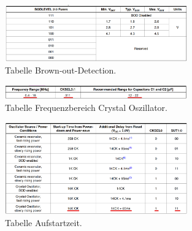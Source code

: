

\begin{figure}[H]
	\centering
	\includegraphics[width=0.7\textwidth]{graphics/Tabelle_BoD}
	\caption{Tabelle Brown-out-Detection.}
	\label{fig:Tabelle_BoD}
\end{figure}



\begin{figure}[H]
	\centering
	\includegraphics[width=0.7\textwidth]{graphics/Tabelle_Crystal}
	\caption{Tabelle Frequenzbereich Crystal Oszillator.}
	\label{fig:Tabelle_Crystal}
\end{figure}


\begin{figure}[H]
	\centering
	\includegraphics[width=0.7\textwidth]{graphics/Tabelle_Crystal2}
	\caption{Tabelle Aufstartzeit.}
	\label{fig:Tabelle_Crystal2}
\end{figure}

